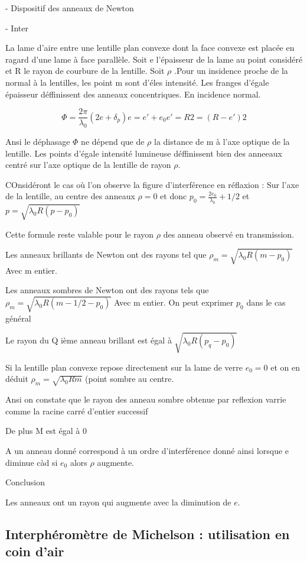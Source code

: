 \documentclass[a4paper,12pt]{article}
\theoremstyle{StyleTheo_will}
\theoremstyle{remark}
\begin{document}
- Dispositif des anneaux de Newton

- Inter

La lame d'aire entre une lentille plan convexe dont la face convexe est placée en ragard d'une lame à face parallèle. 
Soit e l'épaisseur de la lame au point considéré et R le rayon de courbure de la lentille. Soit $\rho$ .Pour un insidence proche de la normal à la lentilles, les point m sont d'éles intensité. Les franges d'égale épaisseur déffinissent des anneaux concentriques. En incidence normal.%

\[
\Phi = \frac{2\pi}{\lambda_0}(2e+\delta_p)
e = e' + e_0
e'= 
R2 =(R-e')2
\]

Ansi le déphasage $\Phi$ ne dépend que de $\rho$ la distance de m à l'axe optique de la lentille. Les points d'égale intensité lumineuse déffinissent bien des anneeaux centré sur l'axe optique de la lentille de rayon $\rho$.

COnsidéront le cas où l'on observe la figure d'interférence en réflaxion : Sur l'axe de la lentille, au centre des anneaux $\rho = 0$ et donc $p_0= \frac{2e_0}{\lambda_0} + 1/2$ et $p = \sqrt{\lambda_0 R (p-p_0)}$

Cette formule reste valable pour le rayon $\rho$ des anneau observé en transmission.

Les anneaux brillants de Newton ont des rayons tel que $\rho_m = \sqrt{\lambda_0 R(m-p_0)} $ Avec m entier.

Les anneaux sombres de Newton ont des rayons tels que $\rho_m = \sqrt{\lambda_0 R(m-1/2-p_0)} $ Avec m entier. On peut exprimer $p_0$ dans le cas général

Le rayon du Q ième anneau brillant est égal à $\sqrt{\lambda_0  R (p_q-p_0)}$

Si la lentille plan convexe repose directement sur la lame de verre $e_0 =0$ et on en déduit $\rho_m = \sqrt{\lambda_0 R m} $ (point sombre au centre.

Ansi on constate que le rayon des anneau sombre obtenue par reflexion varrie comme la racine carré d'entier successif

De plus M est égal à 0

A un anneau donné correspond à un ordre d'interférence donné ainsi lorsque e diminue càd si $e_0$ alors $\rho$ augmente.

Conclusion

Les anneaux ont un rayon qui augmente avec la diminution de $e$.

\subsection{Interphéromètre de Michelson : utilisation en coin d'air}
\end{document}

